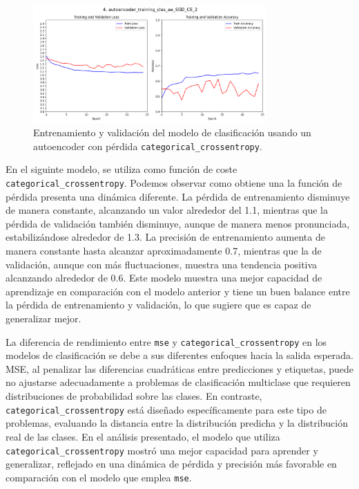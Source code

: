 \begin{figure}[H]
    \centering
    \includegraphics[width=0.8\textwidth]{img/aeMMC_sgd_ce.png}
    \caption{Entrenamiento y validación del modelo de clasificación usando un autoencoder con pérdida \lstinline|categorical_crossentropy|.}
    \label{fig:sgd_ce}
\end{figure}

En el siguinte modelo, se utiliza como función de coste \lstinline|categorical_crossentropy|. Podemos observar como obtiene una la función de pérdida presenta una dinámica diferente. La pérdida de entrenamiento disminuye de manera constante, alcanzando un valor alrededor del 1.1, mientras que la pérdida de validación también disminuye, aunque de manera menos pronunciada, estabilizándose alrededor de 1.3. La precisión de entrenamiento aumenta de manera constante hasta alcanzar aproximadamente 0.7, mientras que la de validación, aunque con más fluctuaciones, muestra una tendencia positiva alcanzando alrededor de 0.6. Este modelo muestra una mejor capacidad de aprendizaje en comparación con el modelo anterior y tiene un buen balance entre la pérdida de entrenamiento y validación, lo que sugiere que es capaz de generalizar mejor.

La diferencia de rendimiento entre \lstinline|mse| y \lstinline|categorical_crossentropy| en los modelos de clasificación se debe a sus diferentes enfoques hacia la salida esperada. MSE, al penalizar las diferencias cuadráticas entre predicciones y etiquetas, puede no ajustarse adecuadamente a problemas de clasificación multiclase que requieren distribuciones de probabilidad sobre las clases. En contraste, \lstinline|categorical_crossentropy| está diseñado específicamente para este tipo de problemas, evaluando la distancia entre la distribución predicha y la distribución real de las clases. En el análisis presentado, el modelo que utiliza \lstinline|categorical_crossentropy| mostró una mejor capacidad para aprender y generalizar, reflejado en una dinámica de pérdida y precisión más favorable en comparación con el modelo que emplea \lstinline|mse|.



